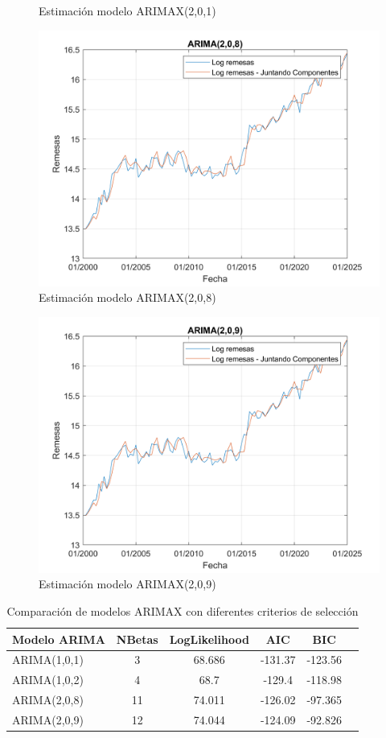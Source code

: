 \documentclass{article}
\theoremstyle{remark}
\theoremstyle{definition}
\begin{document}
\begin{enumerate}[label=\emph{\alph*})]
\begin{tcolorbox}[title=Soluci\'on 3.e]
\begin{figure}[H]
                \caption{Estimación modelo ARIMAX(2,0,1)}
                \label{fig:enter-label}
            \end{figure}
            \begin{figure}[H]
                \centering
                \includegraphics[width=0.5\linewidth]{docs/Arima_1_0_8.png}
                \caption{Estimación modelo ARIMAX(2,0,8)}
                \label{fig:enter-label}
            \end{figure}

            \begin{figure}[H]
                \centering
                \includegraphics[width=0.5\linewidth]{docs/Arima_2_0_9.png}
                \caption{Estimación modelo ARIMAX(2,0,9)}
                \label{fig:enter-label}
            \end{figure}
        \end{tcolorbox}

    \begin{table}[H]
\centering
\scriptsize
\begin{tabular}{lccccc|}
\hline
\textbf{Modelo ARIMA} & \textbf{NBetas} & \textbf{LogLikelihood} & \textbf{AIC} & \textbf{BIC} \\
\hline
ARIMA(1,0,1) & 3 & 68.686 & -131.37 & -123.56 \\
ARIMA(1,0,2) & 4 & 68.7 & -129.4 & -118.98 \\
ARIMA(2,0,8) & 11 & 74.011 & -126.02 & -97.365 \\
ARIMA(2,0,9) & 12 & 74.044 & -124.09 & -92.826 \\
\hline
\end{tabular}
\caption{Comparación de modelos ARIMAX con diferentes criterios de selección}
\label{tab:modelos_arima}
\end{table}


\end{enumerate}
\end{document}
